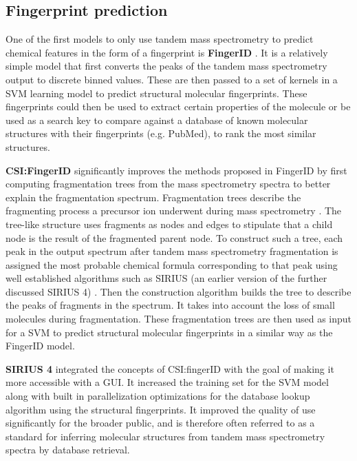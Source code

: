 
\subsection{Fingerprint prediction}

One of the first models to only use tandem mass spectrometry to predict chemical features in the form of a fingerprint is \textbf{FingerID} \cite{heinonen2012metabolite}. It is a relatively simple model that first converts the peaks of the tandem mass spectrometry output to discrete binned values. These are then passed to a set of kernels in a \ac{SVM} learning model to predict structural molecular fingerprints. These fingerprints could then be used to extract certain properties of the molecule or be used as a search key to compare against a database of known molecular structures with their fingerprints (e.g. PubMed), to rank the most similar structures. 

\textbf{CSI:FingerID} \cite{duhrkop2015searching} significantly improves the methods proposed in FingerID by first computing fragmentation trees from the mass spectrometry spectra to better explain the fragmentation spectrum.
Fragmentation trees describe the fragmenting process a precursor ion underwent during mass spectrometry \cite{bocker2008towards}. The tree-like structure uses fragments as nodes and edges to stipulate that a child node is the result of the fragmented parent node. To construct such a tree,
each peak in the output spectrum after tandem mass spectrometry fragmentation is assigned the most probable chemical formula corresponding to that peak using well established algorithms such as SIRIUS (an earlier version of the further discussed SIRIUS 4) \cite{duhrkop2019sirius}.
Then the construction algorithm builds the tree to describe the peaks of fragments in the spectrum.
It takes into account the loss of small molecules during fragmentation.
These fragmentation trees are then used as input for a \ac{SVM} to predict structural molecular fingerprints in a similar way as the FingerID model.

\textbf{SIRIUS 4} \cite{duhrkop2019sirius} integrated the concepts of CSI:fingerID with the goal of making it more accessible with a \ac{GUI}. It increased the training set for the \ac{SVM} model along with built in parallelization optimizations for the database lookup algorithm using the structural fingerprints. It improved the quality of use significantly for the broader public, and is therefore often referred to as a standard for inferring molecular structures from tandem mass spectrometry spectra by database retrieval.

